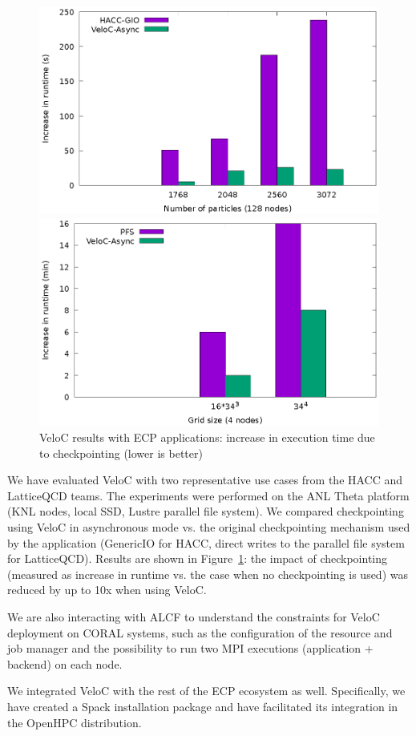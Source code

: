 \begin{figure}[t]
  \begin{subfloat}
  \centering
  \includegraphics[width=.47\textwidth]{projects/2.3.4-DataViz/2.3.4.14-VeloC-SZ/veloc-hacc}
  \end{subfloat}
  \hfill
  \begin{subfloat}
  \centering
  \includegraphics[width=.47\textwidth]{projects/2.3.4-DataViz/2.3.4.14-VeloC-SZ/veloc-lqcd}
  \end{subfloat}
  \caption{VeloC results with ECP applications: increase in execution time due to checkpointing (lower is better)}
  \label{fig:veloc:results}%
\end{figure}

We have evaluated VeloC with two representative use cases from the
HACC and LatticeQCD teams. The experiments were performed on the
ANL Theta platform (KNL nodes, local SSD, Lustre parallel file system).
We compared checkpointing using VeloC in asynchronous mode vs. the
original checkpointing mechanism used by the application (GenericIO
for HACC, direct writes to the parallel file system for LatticeQCD).
Results are shown in Figure~\ref{fig:veloc:results}: the impact
of checkpointing (measured as increase in runtime vs. the case
when no checkpointing is used) was reduced by up to 10x when using
VeloC.

We are also interacting with ALCF to understand the constraints for
VeloC deployment on CORAL systems, such as the configuration of the
resource and job manager and the possibility to run two MPI executions
(application + backend) on each node.

We integrated VeloC with the rest of the ECP ecosystem as well. Specifically,
we have created a Spack installation package and have facilitated its
integration in the OpenHPC distribution.

